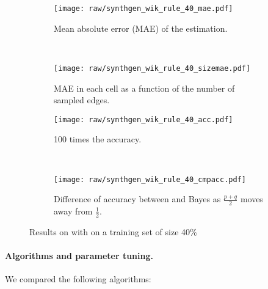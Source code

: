 \begin{figure*}[hbtp]
  \begin{subfigure}[b]{0.504\textwidth} 
    \texttt{[image: raw/synthgen\_wik\_rule\_40\_mae.pdf]} 
    \caption{Mean absolute error (MAE) of the \etauv{} estimation.} 
    \label{fig:tr_synth_mae}
  \end{subfigure}~
  \begin{subfigure}[b]{0.504\textwidth} 
    \texttt{[image: raw/synthgen\_wik\_rule\_40\_sizemae.pdf]} 
    \caption{MAE in each cell as a function of the number of sampled edges.} 
    \label{fig:tr_synth_sizemae}
  \end{subfigure}

  \begin{subfigure}[b]{0.504\textwidth} 
    \texttt{[image: raw/synthgen\_wik\_rule\_40\_acc.pdf]} 
    \caption{100 times the accuracy.} 
    \label{fig:tr_synth_acc}
  \end{subfigure}~
  \begin{subfigure}[b]{0.504\textwidth} 
    \texttt{[image: raw/synthgen\_wik\_rule\_40\_cmpacc.pdf]} 
    \caption{Difference of accuracy between \usrule{} and Bayes as $\frac{p+q}{2}$ moves away from $\frac{1}{2}$.} 
    \label{fig:tr_synth_cmpacc}
  \end{subfigure}
  \caption{Results on \wik{} with \usrule{} on a training set of size 40\%}
\end{figure*}

\paragraph{Algorithms and parameter tuning.} 
We compared the following algorithms:

